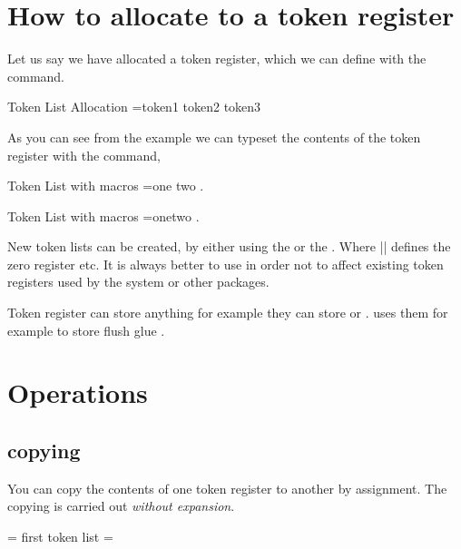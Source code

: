 \section{How to allocate to a token register}

\begin{macro}{\newtoks}
Let us say we have allocated a token register, which we can define with the \cmd{\newtoks} command.
\end{macro}


\begin{texexample}{Token List Allocation}{}
\newtoks\alist 
\alist={token1 token2 token3}
\the\alist
\end{texexample}

As you can see from the example we can typeset the contents of the token register with the  command,

\begin{texexample}{Token List with macros}{}
\begingroup
\def\c{one}
\def\d{two}
\newtoks\blist 
\blist={{\c} {\d}}
\the\blist. 
\endgroup
\end{texexample}


\begin{texexample}{Token List with macros}{}
\begingroup
\def\c{one}
\def\d{two}
\newtoks\blist 
\blist={\c \d}
\the\blist. 
\endgroup
\end{texexample}

New token lists can be created, by either using the \cmd{\newtoks} or the \cmd{\toks}. Where || defines the zero register etc. It is always better to use \cmd{\newtoks} in order not to affect existing token registers used by the system or other packages.

Token register can store anything for example they can store \cmd{\vfil} or \cmd{\hfill}. \latexe uses them for example to store flush glue \cmd{\@temptoken}.

\section{Operations}
\subsection{copying}

You can copy the contents of one token register to another by assignment. The copying is carried out \emph{without expansion}.

\begin{texexample}{}{}
\makeatletter
\newtoks\@exampletoksa
\newtoks\@exampletoksb
\@exampletoksa = {first token list}
\@exampletoksb=\@exampletoksa
\the\@exampletoksb
\makeatother
\end{texexample}

